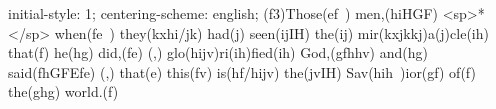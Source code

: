 initial-style: 1;
centering-scheme: english;
(f3)Those(ef~) men,(hiHGF) <sp>*</sp> when(fe~) they(kxhi/jk) had(j) seen(ijIH) the(ij) mir(kxjkkj)a(j)cle(ih) that(f) he(hg) did,(fe) (,) glo(hijv)ri(ih)fied(ih) God,(gfhhv) and(hg) said(fhGFEfe) (,) that(e) this(fv) is(hf/hijv) the(jvIH) Sav(hih~)ior(gf) of(f) the(ghg) world.(f)
